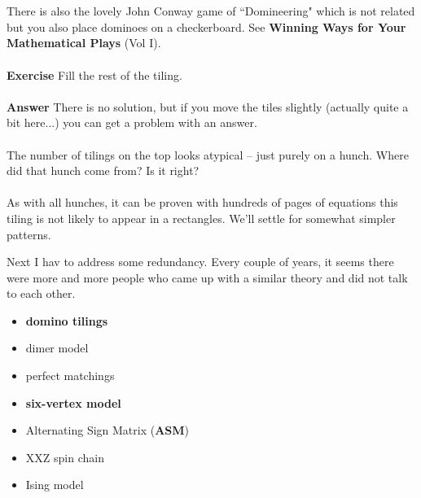 \documentclass[12pt]{article}
\begin{document}
 \\ \\
There is also the lovely John Conway game of ``Domineering" which is not related but you also place dominoes on a checkerboard. See \textbf{Winning Ways for Your Mathematical Plays} (Vol I). \\ \\
\textbf{Exercise} Fill the rest of the tiling. \\ \\
\textbf{Answer} There is no solution, but if you move the tiles slightly (actually quite a bit here...) you can get a problem with an answer.  \\ \\
The number of tilings on the top looks atypical -- just purely on a hunch.  Where did that hunch come from? Is it right? \\ \\
As with all hunches, it can be proven with hundreds of pages of equations this tiling is not likely to appear in a rectangles.  We'll settle for somewhat simpler patterns. 

\newpage

\noindent 

\newpage 

\noindent Next I hav to address some redundancy.  Every couple of years, it seems there were more and more people who came up with a similar theory and did not talk to each other.



\begin{itemize}
\item \textbf{domino tilings} 
\item dimer model 
\item perfect matchings
\item \textbf{six-vertex  model}
\item Alternating Sign Matrix (\textbf{ASM})
\item XXZ spin chain
\item Ising model
\end{itemize}
\end{document}
